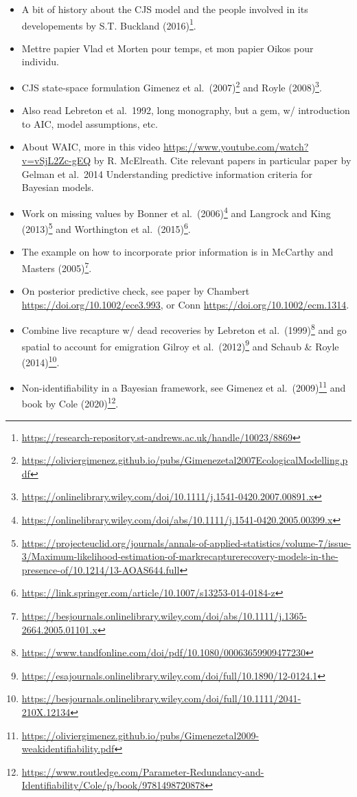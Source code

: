 \documentclass[
  12pt,
]{krantz}
\renewcommand{\href}[2]{#2\footnote{\url{#1}}}
\begin{document}
\begin{itemize}
\item
  A bit of history about the CJS model and the people involved in its developements by \href{https://research-repository.st-andrews.ac.uk/handle/10023/8869}{S.T. Buckland (2016)}.
\item
  Mettre papier Vlad et Morten pour temps, et mon papier Oikos pour individu.
\item
  CJS state-space formulation \href{https://oliviergimenez.github.io/pubs/Gimenezetal2007EcologicalModelling.pdf}{Gimenez et al.~(2007)} and \href{https://onlinelibrary.wiley.com/doi/10.1111/j.1541-0420.2007.00891.x}{Royle (2008)}.
\item
  Also read Lebreton et al.~1992, long monography, but a gem, w/ introduction to AIC, model assumptions, etc.
\item
  About WAIC, more in this video \url{https://www.youtube.com/watch?v=vSjL2Zc-gEQ} by R. McElreath. Cite relevant papers in particular paper by Gelman et al.~2014 Understanding predictive information criteria for Bayesian models.
\item
  Work on missing values by \href{https://onlinelibrary.wiley.com/doi/abs/10.1111/j.1541-0420.2005.00399.x}{Bonner et al.~(2006)} and \href{https://projecteuclid.org/journals/annals-of-applied-statistics/volume-7/issue-3/Maximum-likelihood-estimation-of-markrecapturerecovery-models-in-the-presence-of/10.1214/13-AOAS644.full}{Langrock and King (2013)} and \href{https://link.springer.com/article/10.1007/s13253-014-0184-z}{Worthington et al.~(2015)}.
\item
  The example on how to incorporate prior information is in \href{https://besjournals.onlinelibrary.wiley.com/doi/abs/10.1111/j.1365-2664.2005.01101.x}{McCarthy and Masters (2005)}.
\item
  On posterior predictive check, see paper by Chambert \url{https://doi.org/10.1002/ece3.993}, or Conn \url{https://doi.org/10.1002/ecm.1314}.
\item
  Combine live recapture w/ dead recoveries by \href{https://www.tandfonline.com/doi/pdf/10.1080/00063659909477230}{Lebreton et al.~(1999)} and go spatial to account for emigration \href{https://esajournals.onlinelibrary.wiley.com/doi/full/10.1890/12-0124.1}{Gilroy et al.~(2012)} and \href{https://besjournals.onlinelibrary.wiley.com/doi/full/10.1111/2041-210X.12134}{Schaub \& Royle (2014)}.
\item
  Non-identifiability in a Bayesian framework, see \href{https://oliviergimenez.github.io/pubs/Gimenezetal2009-weakidentifiability.pdf}{Gimenez et al.~(2009)} and \href{https://www.routledge.com/Parameter-Redundancy-and-Identifiability/Cole/p/book/9781498720878}{book by Cole (2020)}.
\end{itemize}
\end{document}
